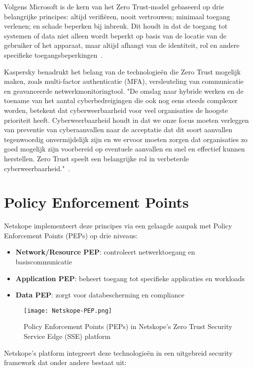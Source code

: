 Volgens Microsoft is de kern van het Zero Trust-model gebaseerd op drie belangrijke principes: altijd verifiëren, nooit vertrouwen; minimaal toegang verlenen; en schade beperken bij inbreuk. Dit houdt in dat de toegang tot systemen of data niet alleen wordt beperkt op basis van de locatie van de gebruiker of het apparaat, maar altijd afhangt van de identiteit, rol en andere specifieke toegangsbeperkingen~\autocite{Microsoft2024}. 


Kaspersky benadrukt het belang van de technologieën die Zero Trust mogelijk maken, zoals multi-factor authenticatie (MFA), versleuteling van communicatie en geavanceerde netwerkmonitoringtool. "De omslag naar hybride werken en de toename van het aantal cyberbedreigingen die ook nog eens steeds complexer worden, betekent dat cyberweerbaarheid voor veel organisaties de hoogste prioriteit heeft. Cyberweerbaarheid houdt in dat we onze focus moeten verleggen van preventie van cyberaanvallen naar de acceptatie dat dit soort aanvallen tegenwoordig onvermijdelijk zijn en we ervoor moeten zorgen dat organisaties zo goed mogelijk zijn voorbereid op eventuele aanvallen en snel en effectief kunnen herstellen. Zero Trust speelt een belangrijke rol in verbeterde cyberweerbaarheid."~\autocite{Kaspersky2024}.

\section{Policy Enforcement Points}
Netskope implementeert deze principes via een gelaagde aanpak met Policy Enforcement Points (PEPs) op drie niveaus:

\begin{itemize}
  \item \textbf{Network/Resource PEP}: controleert netwerktoegang en basiscommunicatie
  \item \textbf{Application PEP}: beheert toegang tot specifieke applicaties en workloads
  \item \textbf{Data PEP}: zorgt voor databescherming en compliance
\end{itemize}
\begin{figure}
  \centering
  \texttt{[image: Netskope-PEP.png]}
  \caption[]{Policy Enforcement Points (PEPs) in Netskope's Zero Trust Security Service Edge (SSE) platform~\autocite{Netskope2024}}
\end{figure}


 Netskope's platform integreert deze technologieën in een uitgebreid security framework dat onder andere bestaat uit:


